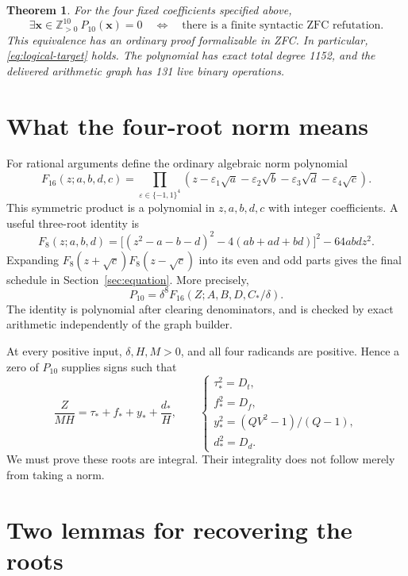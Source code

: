 \documentclass[11pt]{article}
\newtheorem{theorem}{Theorem}[section]
\theoremstyle{remark}
\newcommand{\Zp}{\mathbb Z_{>0}}
\begin{document}
\begin{theorem}\label{thm:main}
For the four fixed coefficients specified above,
\[
 \exists\mathbf x\in\Zp^{10}\ P_{10}(\mathbf x)=0
 \quad\Longleftrightarrow\quad
 \text{there is a finite syntactic ZFC refutation}.
\]
This equivalence has an ordinary proof formalizable in ZFC. In particular,
\eqref{eq:logical-target} holds. The polynomial has exact total degree
1152, and the delivered arithmetic graph has 131 live binary operations.
\end{theorem}

\section{What the four-root norm means}

For rational arguments define the ordinary algebraic norm polynomial
\[
 F_{16}(z;a,b,d,c)=
 \prod_{\varepsilon\in\{-1,1\}^4}
 (z-\varepsilon_1\sqrt a-\varepsilon_2\sqrt b
     -\varepsilon_3\sqrt d-\varepsilon_4\sqrt c).
\]
This symmetric product is a polynomial in $z,a,b,d,c$ with integer
coefficients. A useful three-root identity is
\begin{equation}\label{eq:F8}
 F_8(z;a,b,d)=
 \bigl[(z^2-a-b-d)^2-4(ab+ad+bd)\bigr]^2-64abdz^2.
\end{equation}
Expanding $F_8(z+\sqrt c)F_8(z-\sqrt c)$ into its even and odd parts
gives the final schedule in Section~\ref{sec:equation}. More precisely,
\begin{equation}\label{eq:normidentity}
 P_{10}=\delta^8F_{16}(Z;A,B,D,C_*/\delta).
\end{equation}
The identity is polynomial after clearing denominators, and is checked
by exact arithmetic independently of the graph builder.

At every positive input, $\delta,H,M>0$, and all four radicands are
positive. Hence a zero of $P_{10}$ supplies signs such that
\begin{equation}\label{eq:root-equality}
 \frac{Z}{MH}=\tau_*+f_*+y_*+\frac{d_*}{H},
 \qquad
 \begin{cases}
 \tau_*^2=D_t,\\
 f_*^2=D_f,\\
 y_*^2=(QV^2-1)/(Q-1),\\
 d_*^2=D_d.
 \end{cases}
\end{equation}
We must prove these roots are integral. Their integrality does not follow
merely from taking a norm.

\section{Two lemmas for recovering the roots}
\end{document}
